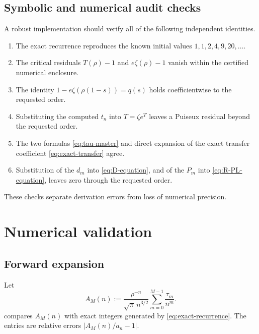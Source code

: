 \documentclass[11pt,oneside]{article}
\numberwithin{equation}{section}
\theoremstyle{plain}
\theoremstyle{definition}
\theoremstyle{remark}
\begin{document}
\subsection{Symbolic and numerical audit checks}

A robust implementation should verify all of the following independent
identities.
\begin{enumerate}
\item The exact recurrence reproduces the known initial values
      $1,1,2,4,9,20,\ldots$.
\item The critical residuals $T(\rho)-1$ and $e\zeta(\rho)-1$ vanish within
      the certified numerical enclosure.
\item The identity
      $1-e\zeta(\rho(1-s))=q(s)$ holds coefficientwise to the requested
      order.
\item Substituting the computed $t_n$ into
      $T=\zeta e^T$ leaves a Puiseux residual beyond the requested order.
\item The two formulas \eqref{eq:tau-master} and direct expansion of the
      exact transfer coefficient \eqref{eq:exact-transfer} agree.
\item Substitution of the $d_m$ into \eqref{eq:D-equation}, and of the
      $P_m$ into \eqref{eq:R-PL-equation}, leaves zero through the requested
      order.
\end{enumerate}
These checks separate derivation errors from loss of numerical precision.

\section{Numerical validation}\label{sec:numerics}

\subsection{Forward expansion}

Let
\begin{equation}\label{eq:A-M}
 A_M(n):=\frac{\rho^{-n}}{\sqrt\pi\,n^{3/2}}
 \sum_{m=0}^{M-1}\frac{\tau_m}{n^m}.
\end{equation}
 compares $A_M(n)$ with exact integers generated by
\eqref{eq:exact-recurrence}.  The entries are relative errors
$|A_M(n)/a_n-1|$.
\end{document}
